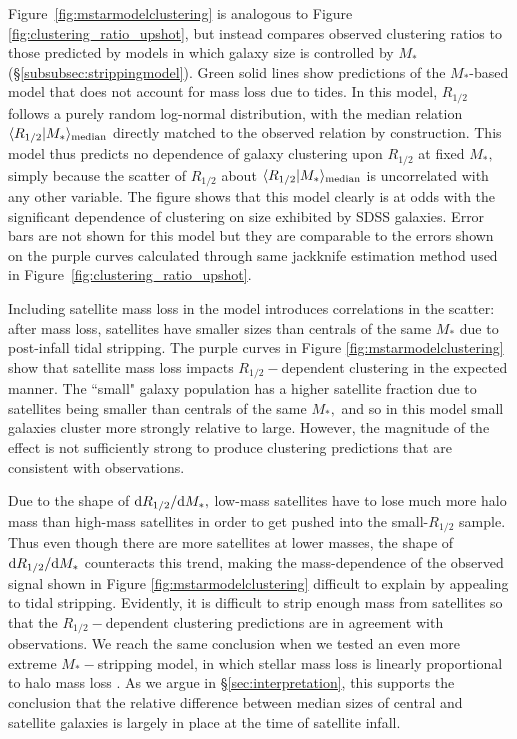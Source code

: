 \documentclass[usenatbib,usegraphicx,letterpaper]{mn2e}
\newcommand{\rhalf}{R_{1/2}}
\newcommand{\mstar}{M_{\ast}}
\newcommand{\median}[2]{\langle{#1}\vert{#2}\rangle_{\rm median}}
\begin{document}
Figure~\ref{fig:mstarmodelclustering} is analogous to Figure \ref{fig:clustering_ratio_upshot}, but instead compares observed clustering ratios to those predicted by models
in which galaxy size is controlled by $\mstar$ (\S\ref{subsubsec:strippingmodel}). Green solid lines show predictions of the $\mstar$-based model that does not account for mass loss due to tides. In this model, $\rhalf$ follows a purely random log-normal distribution, with the median relation $\median{\rhalf}{\mstar}$ directly matched to the observed relation by construction.  This model thus predicts no dependence of galaxy clustering upon $\rhalf$ at fixed $\mstar,$ simply because the scatter of $\rhalf$ about $\median{\rhalf}{\mstar}$ is uncorrelated with any other variable. The figure shows that this model clearly is at odds with the significant dependence of clustering on size exhibited by SDSS galaxies. Error bars are not shown for this model but they are comparable to the errors shown on the purple curves calculated through same jackknife estimation method used in Figure~\ref{fig:clustering_ratio_upshot}. 

Including satellite mass loss in the model introduces correlations in the scatter: after mass loss, satellites have smaller sizes than centrals of the same $\mstar$ due to post-infall tidal stripping.
The purple curves in Figure \ref{fig:mstarmodelclustering} show that satellite mass loss impacts $\rhalf-$dependent clustering in the expected manner. The ``small" galaxy population has a higher satellite fraction due to satellites being smaller than centrals of the same $\mstar,$ and so in this model small galaxies cluster more strongly relative to large. However, the magnitude of the effect is not sufficiently strong to produce clustering predictions that are consistent with observations. 

Due to the shape of ${\rm d}\rhalf/{\rm d}\mstar,$ low-mass satellites have to lose much more halo mass than high-mass satellites in order to get pushed into the small-$\rhalf$ sample. Thus even though there are more satellites at lower masses, the shape of ${\rm d}\rhalf/{\rm d}\mstar$ counteracts this trend, making the mass-dependence of the observed signal shown in Figure \ref{fig:mstarmodelclustering} difficult to explain by appealing to tidal stripping. Evidently, it is difficult to strip enough mass from satellites so that the $\rhalf-$dependent clustering predictions are in agreement with observations.  We reach the same conclusion when we tested an even more extreme $\mstar-$stripping model, in which stellar mass loss is linearly proportional to halo mass loss \citep[][Model 1]{watson_etal12}.
As we argue in \S\ref{sec:interpretation}, this supports the conclusion that the relative difference between median sizes of central and satellite galaxies is largely in place at the time of satellite infall.
\end{document}
